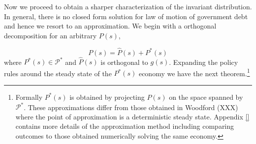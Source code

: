 \documentclass[11.5pt,twoside]{article}
\begin{document}
Now we proceed to obtain a sharper characterization of the invariant distribution. In general, there is no closed form solution for law of motion of government debt and hence we resort to an approximation. We begin with a orthogonal decomposition for an arbitrary $P(s)$,

\[P(s)=\hat{P}(s)+P^*(s)\] where $P^*(s)\in \mathcal{P}^*$ and $\hat{P}(s)$ is orthogonal to $g(s)$. Expanding the policy rules around the steady state of the $P^*(s)$ economy we have the next theorem.\footnote{ Formally $P^*(s) $ is obtained by projecting $P(s)$ on the space spanned by $\mathcal{P}^*$. These approximations differ from those obtained in Woodford (XXX) where the point of approximation is a deterministic steady state. Appendix \ref{} contains more details of the approximation method including comparing outcomes to those obtained numerically solving the same economy.} 
\end{document}

